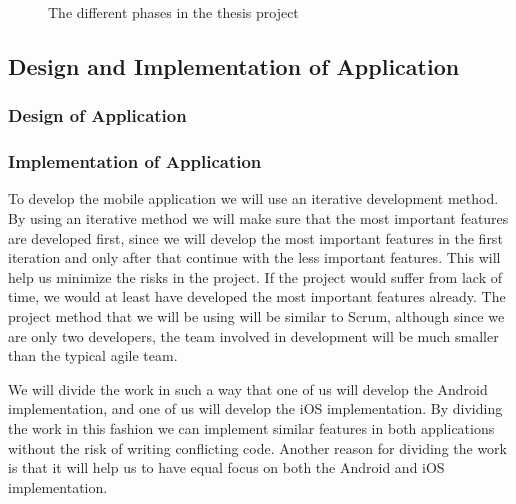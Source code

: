 \documentclass[12pt, a4paper, onecolumn]{article}
\begin{document}
\begin{figure}[h]
	\centering
	\caption{The different phases in the thesis project}%
	\label{fig:example}%
\end{figure}

\subsection{Design and Implementation of Application}

\subsubsection{Design of Application}

\subsubsection{Implementation of Application}

To develop the mobile application we will use an iterative development method. By using an iterative method we will make sure that the most important features are developed first, since we will develop the most important features in the first iteration and only after that continue with the less important features. This will help us  minimize the risks in the project. If the project would suffer from lack of time, we would at least have developed the most important features already. The project method that we will be using will be similar to Scrum, although since we are only two developers, the team involved in development will be much smaller than the typical agile team.

We will divide the work in such a way that one of us will develop the Android implementation, and one of us will develop the iOS implementation. By dividing the work in this fashion we can implement similar features in both applications without the risk of writing conflicting code. Another reason for dividing the work is that it will help us to have equal focus on both the Android and iOS implementation.
\end{document}
